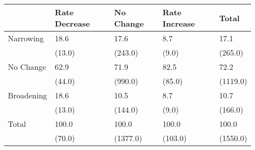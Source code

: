 \begin{tabular}{l*{4}{l}}
\hline
                    &Rate Decrease&   No Change&Rate Increase&       Total\\
\hline
Narrowing           &        18.6&        17.6&         8.7&        17.1\\
                    &      (13.0)&     (243.0)&       (9.0)&     (265.0)\\
No Change           &        62.9&        71.9&        82.5&        72.2\\
                    &      (44.0)&     (990.0)&      (85.0)&    (1119.0)\\
Broadening          &        18.6&        10.5&         8.7&        10.7\\
                    &      (13.0)&     (144.0)&       (9.0)&     (166.0)\\
Total               &       100.0&       100.0&       100.0&       100.0\\
                    &      (70.0)&    (1377.0)&     (103.0)&    (1550.0)\\
\hline
\end{tabular}
